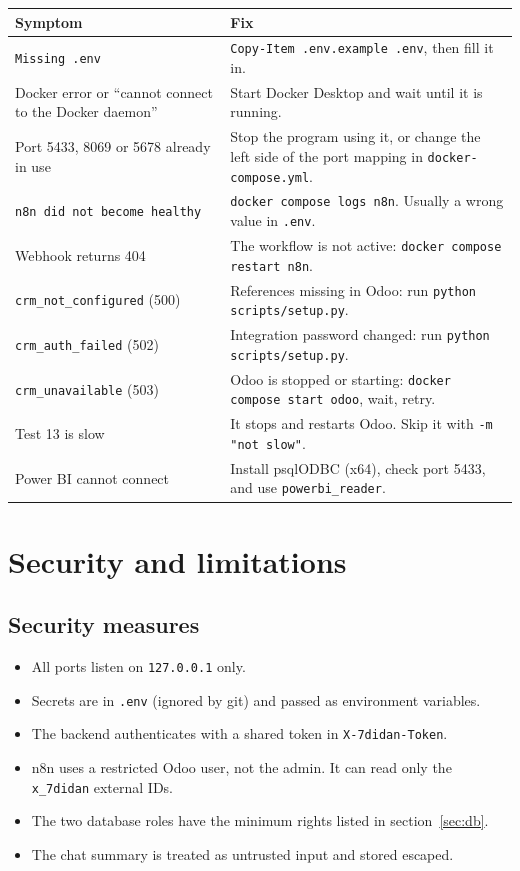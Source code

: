 \documentclass[11pt,a4paper]{article}
\newcommand{\f}[1]{\texttt{#1}}
\begin{document}
\begin{tabularx}{\textwidth}{>{\raggedright\arraybackslash}p{5cm}Y}
  \toprule
  \textbf{Symptom} & \textbf{Fix} \\
  \midrule
  \f{Missing .env} & \f{Copy-Item .env.example .env}, then fill it in. \\
  Docker error or ``cannot connect to the Docker daemon'' & Start Docker Desktop and wait until it is running. \\
  Port 5433, 8069 or 5678 already in use & Stop the program using it, or change the left side of the port mapping in \f{docker-compose.yml}. \\
  \f{n8n did not become healthy} & \f{docker compose logs n8n}. Usually a wrong value in \f{.env}. \\
  Webhook returns 404 & The workflow is not active: \f{docker compose restart n8n}. \\
  \f{crm\_not\_configured} (500) & References missing in Odoo: run \f{python scripts/setup.py}. \\
  \f{crm\_auth\_failed} (502) & Integration password changed: run \f{python scripts/setup.py}. \\
  \f{crm\_unavailable} (503) & Odoo is stopped or starting: \f{docker compose start odoo}, wait, retry. \\
  Test 13 is slow & It stops and restarts Odoo. Skip it with \f{-m "not slow"}. \\
  Power BI cannot connect & Install psqlODBC (x64), check port 5433, and use \f{powerbi\_reader}. \\
  \bottomrule
\end{tabularx}

\section{Security and limitations}

\subsection*{Security measures}
\begin{itemize}
  \item All ports listen on \f{127.0.0.1} only.
  \item Secrets are in \f{.env} (ignored by git) and passed as environment variables.
  \item The backend authenticates with a shared token in \f{X-7didan-Token}.
  \item n8n uses a restricted Odoo user, not the admin. It can read only the \f{x\_7didan} external IDs.
  \item The two database roles have the minimum rights listed in section~\ref{sec:db}.
  \item The chat summary is treated as untrusted input and stored escaped.
\end{itemize}
\end{document}
